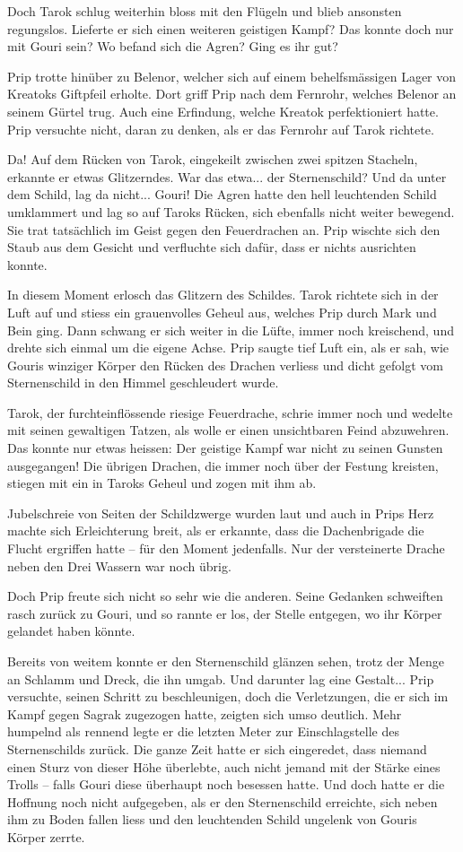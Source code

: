 Doch Tarok schlug weiterhin bloss mit den Flügeln und blieb ansonsten regungslos. Lieferte er sich einen weiteren geistigen Kampf? Das konnte doch nur mit Gouri sein? Wo befand sich die Agren? Ging es ihr gut?

Prip trotte hinüber zu Belenor, welcher sich auf einem behelfsmässigen Lager von Kreatoks Giftpfeil erholte. Dort griff Prip nach dem Fernrohr, welches Belenor an seinem Gürtel trug. Auch eine Erfindung, welche Kreatok perfektioniert hatte. Prip versuchte nicht, daran zu denken, als er das Fernrohr auf Tarok richtete.

Da! Auf dem Rücken von Tarok, eingekeilt zwischen zwei spitzen Stacheln, erkannte er etwas Glitzerndes. War das etwa... der Sternenschild? Und da unter dem Schild, lag da nicht... Gouri! Die Agren hatte den hell leuchtenden Schild umklammert und lag so auf Taroks Rücken, sich ebenfalls nicht weiter bewegend. Sie trat tatsächlich im Geist gegen den Feuerdrachen an. Prip wischte sich den Staub aus dem Gesicht und verfluchte sich dafür, dass er nichts ausrichten konnte.

In diesem Moment erlosch das Glitzern des Schildes. Tarok richtete sich in der Luft auf und stiess ein grauenvolles Geheul aus, welches Prip durch Mark und Bein ging. Dann schwang er sich weiter in die Lüfte, immer noch kreischend, und drehte sich einmal um die eigene Achse. Prip saugte tief Luft ein, als er sah, wie Gouris winziger Körper den Rücken des Drachen verliess und dicht gefolgt vom Sternenschild in den Himmel geschleudert wurde.

Tarok, der furchteinflössende riesige Feuerdrache, schrie immer noch und wedelte mit seinen gewaltigen Tatzen, als wolle er einen unsichtbaren Feind abzuwehren. Das konnte nur etwas heissen: Der geistige Kampf war nicht zu seinen Gunsten ausgegangen! Die übrigen Drachen, die immer noch über der Festung kreisten, stiegen mit ein in Taroks Geheul und zogen mit ihm ab.

Jubelschreie von Seiten der Schildzwerge wurden laut und auch in Prips Herz machte sich Erleichterung breit, als er erkannte, dass die Dachenbrigade die Flucht ergriffen hatte – für den Moment jedenfalls. Nur der versteinerte Drache neben den Drei Wassern war noch übrig.

Doch Prip freute sich nicht so sehr wie die anderen. Seine Gedanken schweiften rasch zurück zu Gouri, und so rannte er los, der Stelle entgegen, wo ihr Körper gelandet haben könnte.

Bereits von weitem konnte er den Sternenschild glänzen sehen, trotz der Menge an Schlamm und Dreck, die ihn umgab. Und darunter lag eine Gestalt... Prip versuchte, seinen Schritt zu beschleunigen, doch die Verletzungen, die er sich im Kampf gegen Sagrak zugezogen hatte, zeigten sich umso deutlich. Mehr humpelnd als rennend legte er die letzten Meter zur Einschlagstelle des Sternenschilds zurück. Die ganze Zeit hatte er sich eingeredet, dass niemand einen Sturz von dieser Höhe überlebte, auch nicht jemand mit der Stärke eines Trolls – falls Gouri diese überhaupt noch besessen hatte. Und doch hatte er die Hoffnung noch nicht aufgegeben, als er den Sternenschild erreichte, sich neben ihm zu Boden fallen liess und den leuchtenden Schild ungelenk von Gouris Körper zerrte.

